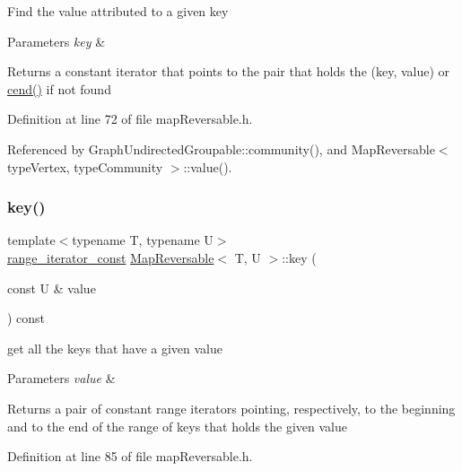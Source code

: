 Find the value attributed to a given key 
\begin{DoxyParams}{Parameters}
{\em key} & \\
\hline
\end{DoxyParams}
\begin{DoxyReturn}{Returns}
a constant iterator that points to the pair that holds the (key, value) or \hyperlink{classMapReversable_acf794209bf91fe8f6026f090ccb7635f}{cend()} if not found 
\end{DoxyReturn}


Definition at line 72 of file map\+Reversable.\+h.



Referenced by Graph\+Undirected\+Groupable\+::community(), and Map\+Reversable$<$ type\+Vertex, type\+Community $>$\+::value().

\mbox{\label{classMapReversable_a96492535f9aa469ffd75f28620b8ead4}} 
\subsubsection{\texorpdfstring{key()}{key()}}
{\footnotesize\ttfamily template$<$typename T, typename U$>$ \\
\hyperlink{classMapReversable_aed8c3cc9e7a8601664db79d56d117adf}{range\+\_\+iterator\+\_\+const} \hyperlink{classMapReversable}{Map\+Reversable}$<$ T, U $>$\+::key (\begin{DoxyParamCaption}\item[{const U \&}]{value }\end{DoxyParamCaption}) const\hspace{0.3cm}{\ttfamily [inline]}}

get all the keys that have a given value 
\begin{DoxyParams}{Parameters}
{\em value} & \\
\hline
\end{DoxyParams}
\begin{DoxyReturn}{Returns}
a pair of constant range iterators pointing, respectively, to the beginning and to the end of the range of keys that holds the given value 
\end{DoxyReturn}


Definition at line 85 of file map\+Reversable.\+h.

\mbox{\label{classMapReversable_a9587d6d95127e6941407af03584d3e00}} 
